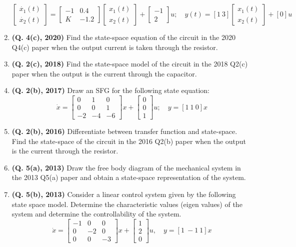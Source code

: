\documentclass[12pt, a4paper]{article}
\begin{document}
\begin{enumerate}
		\[ \begin{bmatrix} \dot{x_1}(t) \\ \dot{x_2}(t) \end{bmatrix} = \begin{bmatrix} -1 & 0.4 \\ K & -1.2 \end{bmatrix} \begin{bmatrix} x_1(t) \\ x_2(t) \end{bmatrix} + \begin{bmatrix} -1 \\ 2 \end{bmatrix} u; \quad y(t) = [1 \ 3] \begin{bmatrix} x_1(t) \\ x_2(t) \end{bmatrix} + [0]u \]
		\item \textbf{(Q. 4(c), 2020)} Find the state-space equation of the circuit in the 2020 Q4(c) paper when the output current is taken through the resistor.
		\item \textbf{(Q. 2(c), 2018)} Find the state-space model of the circuit in the 2018 Q2(c) paper when the output is the current through the capacitor.
		\item \textbf{(Q. 2(b), 2017)} Draw an SFG for the following state equation:
		\[ \dot{x} = \begin{bmatrix} 0 & 1 & 0 \\ 0 & 0 & 1 \\ -2 & -4 & -6 \end{bmatrix} x + \begin{bmatrix} 0 \\ 0 \\ 1 \end{bmatrix} u; \quad y = [1 \ 1 \ 0]x \]
		\item \textbf{(Q. 2(b), 2016)} Differentiate between transfer function and state-space. Find the state-space of the circuit in the 2016 Q2(b) paper when the output is the current through the resistor.
		\item \textbf{(Q. 5(a), 2013)} Draw the free body diagram of the mechanical system in the 2013 Q5(a) paper and obtain a state-space representation of the system.
		\item \textbf{(Q. 5(b), 2013)} Consider a linear control system given by the following state space model. Determine the characteristic values (eigen values) of the system and determine the controllability of the system.
		\[ \dot{x} = \begin{bmatrix} -1 & 0 & 0 \\ 0 & -2 & 0 \\ 0 & 0 & -3 \end{bmatrix} x + \begin{bmatrix} 1 \\ 2 \\ 0 \end{bmatrix} u, \quad y = [1 \ -1 \ 1]x \]

\end{enumerate}
\end{document}
